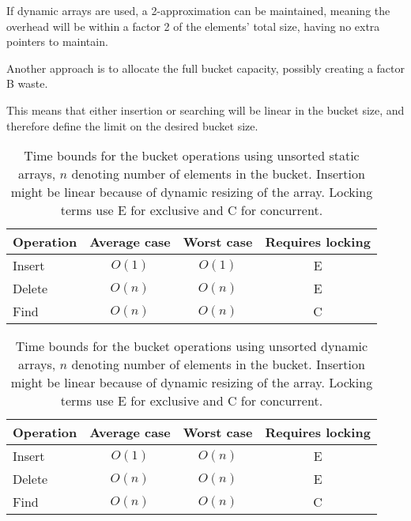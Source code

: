 If dynamic arrays are used, a 2-approximation can be maintained, meaning the
overhead will be within a factor 2 of the elements' total size, having no
extra pointers to maintain.

Another approach is to allocate the full bucket capacity, possibly creating a
factor B waste.

This means that either insertion or searching will be linear in the bucket
size, and therefore define the limit on the desired bucket size.

\begin{table}[h!]
    \centering
    \begin{tabular}[here]{ l || c | c | c}
        Operation & Average case & Worst case & Requires locking  \\ \hline
        Insert    & $O(1)$ & $O(1)$ & E \\ \hline
        Delete    & $O(n)$ & $O(n)$ & E \\ \hline
        Find      & $O(n)$ & $O(n)$ & C  \\ \hline
    \end{tabular}
    \caption{Time bounds for the bucket operations using unsorted static
    arrays, $n$ denoting number of elements in the bucket. Insertion might be
    linear because of dynamic resizing of the array. Locking terms use E for
        exclusive and C for concurrent.}
    \label{tab:bounds:unsortedarray}
\end{table}
\begin{table}[h!]
    \centering
    \begin{tabular}[here]{ l || c | c | c}
        Operation & Average case & Worst case & Requires locking  \\ \hline
        Insert    & $O(1)$ & $O(n)$ & E \\ \hline
        Delete    & $O(n)$ & $O(n)$ & E \\ \hline
        Find      & $O(n)$ & $O(n)$ & C  \\ \hline
    \end{tabular}
    \caption{Time bounds for the bucket operations using unsorted dynamic
    arrays, $n$ denoting number of elements in the bucket. Insertion might be
    linear because of dynamic resizing of the array. Locking terms use E for
        exclusive and C for concurrent.}
    \label{tab:bounds:unsortedarray}
\end{table}

